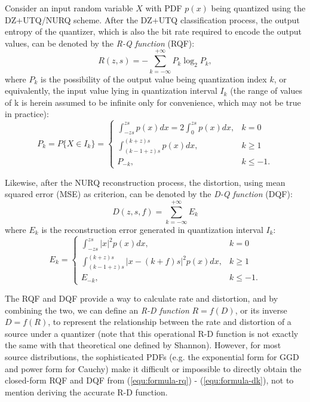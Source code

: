 \documentclass[smallabstract,smallcaptions]{dccpaper}
\begin{document}
Consider an input random variable $X$ with PDF $p(x)$ being quantized using the DZ+UTQ/NURQ scheme. After the DZ+UTQ classification process, the output entropy of the quantizer, which is also the bit rate required to encode the output values, can be denoted by the \emph{R-Q function} (RQF):
\begin{equation}\label{equ:formula-rq}
	R(z, s) = -\sum_{k=-\infty}^{+\infty} P_k \log_2 P_k ,
\end{equation}
where $P_k$ is the possibility of the output value being quantization index $k$, or equivalently, the input value lying in quantization interval $I_{k}$ (the range of values of k is herein assumed to be infinite only for convenience, which may not be true in practice):
\begin{equation}\label{equ:formula-pk}
	P_k = P\{X \in I_k\} =
	\begin{cases}
		\int_{-z s}^{z s} p(x) dx
		= 2 \int_{0}^{z s} p(x) dx,
		& k=0 \\
		\int_{(k-1+z) s}^{(k+z) s} p(x) dx,
		& k \ge 1 \\
		P_{-k},
		& k \le -1 .
	\end{cases}
\end{equation}  

Likewise, after the NURQ reconstruction process, the distortion, using mean squared error (MSE) as criterion, can be denoted by the \emph{D-Q function} (DQF):
\begin{equation}\label{equ:formula-dq}
	D(z, s, f) =\sum_{k=-\infty}^{+\infty} E_k
\end{equation}
where $E_k$ is the reconstruction error generated in quantization interval $I_k$:
\begin{equation}\label{equ:formula-dk}
	E_k=
	\begin{cases}
		\int_{-z s}^{z s} |x|^2 p(x) dx,
		& k=0 \\
		\int_{(k-1+z) s}^{(k+z) s} |x - (k+f) s|^2 p(x) dx,
		& k \ge 1 \\
		E_{-k},
		& k \le -1 .
	\end{cases}
\end{equation}

The RQF and DQF provide a way to calculate rate and distortion, and by combining the two, we can define an \emph{R-D function} $R=f(D)$, or its inverse $D=f(R)$, to represent the relationship between the rate and distortion of a source under a quantizer (note that this operational R-D function is not exactly the same with that theoretical one defined by Shannon). However, for most source distributions, the sophisticated PDFs (e.g. the exponential form for GGD and power form for Cauchy) make it difficult or impossible to directly obtain the closed-form RQF and DQF from (\ref{equ:formula-rq}) - (\ref{equ:formula-dk}), not to mention deriving the accurate R-D function.
\end{document}
